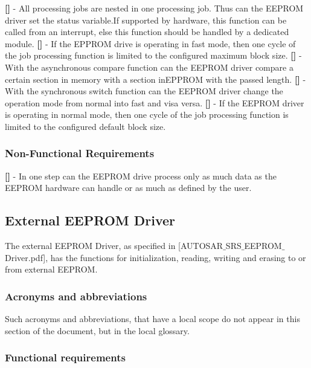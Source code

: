 \newline
{\bf []} - All processing jobs are nested in one processing job. Thus can the \mbox{EEPROM} driver set the status variable.If supported by hardware, this function can be called from an interrupt, else this function should be handled by a dedicated module.\newline
\newline
{\bf []} - If the EPPROM drive is operating in fast mode, then one cycle of the job processing function is limited to the configured maximum block size.\newline
\newline
{\bf []} - With the asynchronous compare function can the EEPROM driver compare a certain section in memory with a section in\mbox{EPPROM} with the passed length.\newline
\newline
{\bf []} - With the synchronous switch function can the EEPROM driver change the operation mode from normal into fast and visa versa.\newline
\newline
{\bf []} - If the EEPROM driver is operating in normal mode, then one cycle of the job processing function is limited to the configured default block size.

\subsubsection{Non-Functional Requirements}
{\bf []} - In one step can the EEPROM drive process only as much data as the EEPROM hardware can handle or as much as defined by the user.
\newpage

\subsection{External EEPROM Driver}
The external EEPROM Driver, as specified in  [AUTOSAR$\_$SRS$\_$EEPROM$\_$Driver.pdf], has the functions for initialization, reading, writing and erasing to or from external \mbox{EEPROM}.
\subsubsection{Acronyms and abbreviations}
Such acronyms and abbreviations, that have a local scope do not appear in this section of the document, but in the local glossary.
\subsubsection{Functional requirements}
